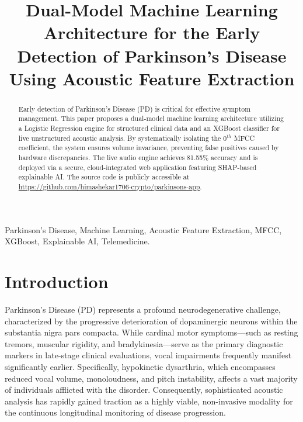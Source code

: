 \documentclass[conference]{IEEEtran}
\begin{document}
\title{Dual-Model Machine Learning Architecture for the Early Detection of Parkinson's Disease Using Acoustic Feature Extraction}

\author{
}

\maketitle

\begin{abstract}
Early detection of Parkinson's Disease (PD) is critical for effective symptom management. This paper proposes a dual-model machine learning architecture utilizing a Logistic Regression engine for structured clinical data and an XGBoost classifier for live unstructured acoustic analysis. By systematically isolating the $0^{th}$ MFCC coefficient, the system ensures volume invariance, preventing false positives caused by hardware discrepancies. The live audio engine achieves 81.55\% accuracy and is deployed via a secure, cloud-integrated web application featuring SHAP-based explainable AI. The source code is publicly accessible at \url{https://github.com/himashekar1706-crypto/parkinsons-app}.
\end{abstract}

\begin{IEEEkeywords}
Parkinson's Disease, Machine Learning, Acoustic Feature Extraction, MFCC, XGBoost, Explainable AI, Telemedicine.
\end{IEEEkeywords}

\section{Introduction}
Parkinson's Disease (PD) represents a profound neurodegenerative challenge, characterized by the progressive deterioration of dopaminergic neurons within the substantia nigra pars compacta. While cardinal motor symptoms---such as resting tremors, muscular rigidity, and bradykinesia---serve as the primary diagnostic markers in late-stage clinical evaluations, vocal impairments frequently manifest significantly earlier. Specifically, hypokinetic dysarthria, which encompasses reduced vocal volume, monoloudness, and pitch instability, affects a vast majority of individuals afflicted with the disorder. Consequently, sophisticated acoustic analysis has rapidly gained traction as a highly viable, non-invasive modality for the continuous longitudinal monitoring of disease progression. 
\end{document}
